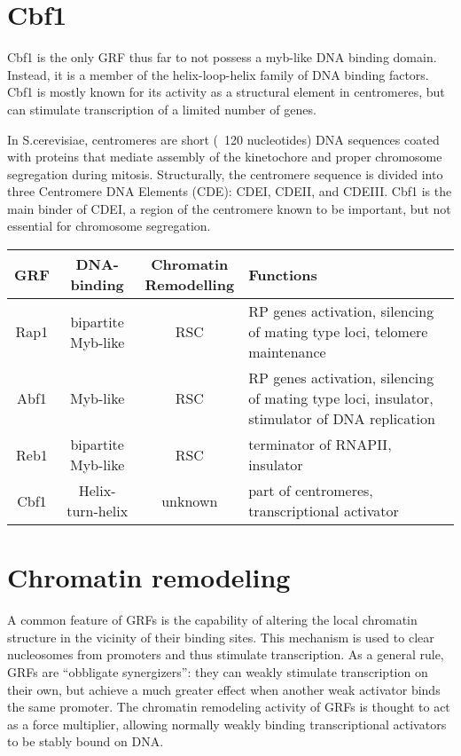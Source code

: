 \section{Cbf1}

Cbf1 is the only GRF thus far to not possess a myb-like DNA binding domain. Instead, it is a member of the helix-loop-helix family of DNA binding factors. Cbf1 is mostly known for its activity as a structural element in centromeres, but can stimulate transcription of a limited number of genes.

In S.cerevisiae, centromeres are short (~120 nucleotides) DNA sequences coated with proteins that mediate assembly of the kinetochore and proper chromosome segregation during mitosis. Structurally, the centromere sequence is divided into three Centromere DNA Elements (CDE): CDEI, CDEII, and CDEIII. Cbf1 is the main binder of CDEI, a region of the centromere known to be important, but not essential for chromosome segregation. 


\begin{tabular}[c]{cccp{5.5cm}}
\hline 
GRF & DNA-binding & \makecell{Chromatin\\Remodelling}  & Functions \\ 
\hline 
Rap1 & bipartite Myb-like & RSC & RP genes activation, silencing of mating type loci, telomere maintenance \vspace{3.5mm} \\ 
Abf1 & Myb-like & RSC & RP genes activation, silencing of mating type loci, insulator, stimulator of DNA replication \vspace{3.5mm} \\
Reb1 & bipartite Myb-like & RSC & terminator of RNAPII, insulator \vspace{3.5mm} \\ 
Cbf1 & Helix-turn-helix & unknown & part of centromeres, transcriptional activator \\ 
\hline 
\end{tabular} 

\section{Chromatin remodeling} 
A common feature of GRFs is the capability of altering the local chromatin structure in the vicinity of their binding sites. This mechanism is used to clear nucleosomes from promoters and thus stimulate transcription. As a general rule, GRFs are “obbligate synergizers”: they can weakly stimulate transcription on their own, but achieve a much greater effect when another weak activator binds the same promoter. The chromatin remodeling activity of GRFs is thought to act as a force multiplier, allowing normally weakly binding transcriptional activators to be stably bound on DNA.

